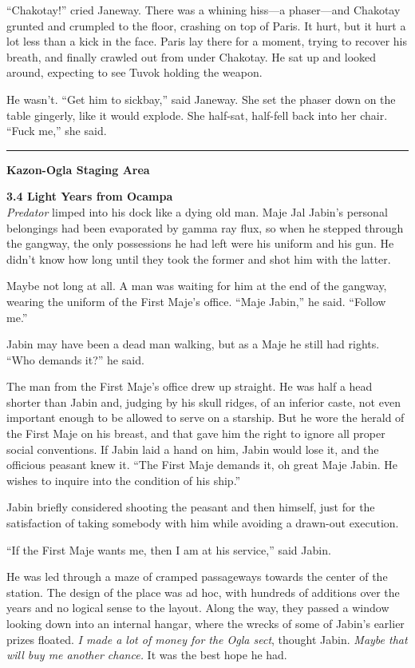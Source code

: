 \documentclass[twoside,letterpaper,12pt]{memoir}
\begin{document}
``Chakotay!'' cried Janeway. There was a whining hiss---a phaser---and Chakotay grunted and crumpled to the floor, crashing on top of Paris. It hurt, but it hurt a lot less than a kick in the face. Paris lay there for a moment, trying to recover his breath, and finally crawled out from under Chakotay. He sat up and looked around, expecting to see Tuvok holding the weapon.

He wasn't. ``Get him to sickbay,'' said Janeway. She set the phaser down on the table gingerly, like it would explode. She half-sat, half-fell back into her chair. ``Fuck me,'' she said.

\fancybreak{\rule{3cm}{0.4 pt}}
\noindent\textbf{Kazon-Ogla Staging Area}

\noindent\textbf{3.4 Light Years from Ocampa}\\

\textit{Predator} limped into his dock like a dying old man. Maje Jal Jabin's personal belongings had been evaporated by gamma ray flux, so when he stepped through the gangway, the only possessions he had left were his uniform and his gun. He didn't know how long until they took the former and shot him with the latter.

Maybe not long at all. A man was waiting for him at the end of the gangway, wearing the uniform of the First Maje's office. ``Maje Jabin,'' he said. ``Follow me.''

Jabin may have been a dead man walking, but as a Maje he still had rights. ``Who demands it?'' he said.

The man from the First Maje's office drew up straight. He was half a head shorter than Jabin and, judging by his skull ridges, of an inferior caste, not even important enough to be allowed to serve on a starship. But he wore the herald of the First Maje on his breast, and that gave him the right to ignore all proper social conventions. If Jabin laid a hand on him, Jabin would lose it, and the officious peasant knew it. ``The First Maje demands it, oh great Maje Jabin. He wishes to inquire into the condition of his ship.''

Jabin briefly considered shooting the peasant and then himself, just for the satisfaction of taking somebody with him while avoiding a drawn-out execution.

``If the First Maje wants me, then I am at his service,'' said Jabin.

He was led through a maze of cramped passageways towards the center of the station. The design of the place was ad hoc, with hundreds of additions over the years and no logical sense to the layout. Along the way, they passed a window looking down into an internal hangar, where the wrecks of some of Jabin's earlier prizes floated. \textit{I made a lot of money for the Ogla sect}, thought Jabin. \textit{Maybe that will buy me another chance.} It was the best hope he had.
\end{document}
